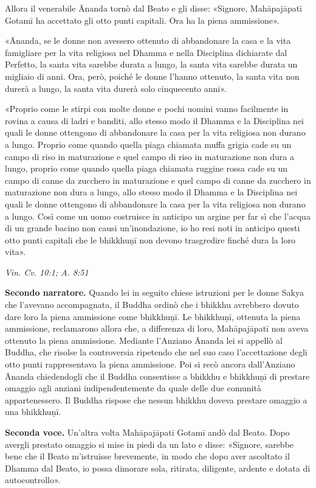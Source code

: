 Allora il venerabile Ānanda tornò dal Beato e gli disse: «Signore,
Mahāpajāpatī Gotamī ha accettato gli otto punti capitali. Ora ha la
piena ammissione».


«Ānanda, se le donne non avessero ottenuto di abbandonare la casa e la
vita famigliare per la vita religiosa nel Dhamma e nella Disciplina
dichiarate dal Perfetto, la santa vita sarebbe durata a lungo, la santa
vita sarebbe durata un migliaio di anni. Ora, però, poiché le donne
l’hanno ottenuto, la santa vita non durerà a lungo, la santa vita durerà
solo cinquecento anni».


«Proprio come le stirpi con molte donne e pochi uomini vanno facilmente
in rovina a causa di ladri e banditi, allo stesso modo il Dhamma e la
Disciplina nei quali le donne ottengono di abbandonare la casa per la
vita religiosa non durano a lungo. Proprio come quando quella piaga
chiamata muffa grigia cade su un campo di riso in maturazione e quel
campo di riso in maturazione non dura a lungo, proprio come quando
quella piaga chiamata ruggine rossa cade su un campo di canne da
zucchero in maturazione e quel campo di canne da zucchero in maturazione
non dura a lungo, allo stesso modo il Dhamma e la Disciplina nei quali
le donne ottengono di abbandonare la casa per la vita religiosa non
durano a lungo. Così come un uomo costruisce in anticipo un argine per
far sì che l’acqua di un grande bacino non causi un’inondazione, io ho
resi noti in anticipo questi otto punti capitali che le bhikkhuṇī non
devono trasgredire finché dura la loro vita».


\emph{Vin. Cv. 10:1; A. 8:51}


\textbf{Secondo narratore.} Quando lei in seguito chiese istruzioni per le donne
Sakya che l’avevano accompagnata, il Buddha ordinò che i bhikkhu
avrebbero dovuto dare loro la piena ammissione come bhikkhuṇī. Le
bhikkhuṇī, ottenuta la piena ammissione, reclamarono allora che, a
differenza di loro, Mahāpajāpatī non aveva ottenuto la piena ammissione.
Mediante l’Anziano Ānanda lei si appellò al Buddha, che risolse la
controversia ripetendo che nel suo caso l’accettazione degli otto punti
rappresentava la piena ammissione. Poi si recò ancora dall’Anziano
Ānanda chiedendogli che il Buddha consentisse a bhikkhu e bhikkhuṇī di
prestare omaggio agli anziani indipendentemente da quale delle due
comunità appartenessero. Il Buddha rispose che nessun bhikkhu doveva
prestare omaggio a una bhikkhuṇī.


\textbf{Seconda voce.} Un’altra volta Mahāpajāpatī Gotamī andò dal Beato. Dopo
avergli prestato omaggio si mise in piedi da un lato e disse: «Signore,
sarebbe bene che il Beato m’istruisse brevemente, in modo che dopo aver
ascoltato il Dhamma dal Beato, io possa dimorare sola, ritirata,
diligente, ardente e dotata di autocontrollo».


